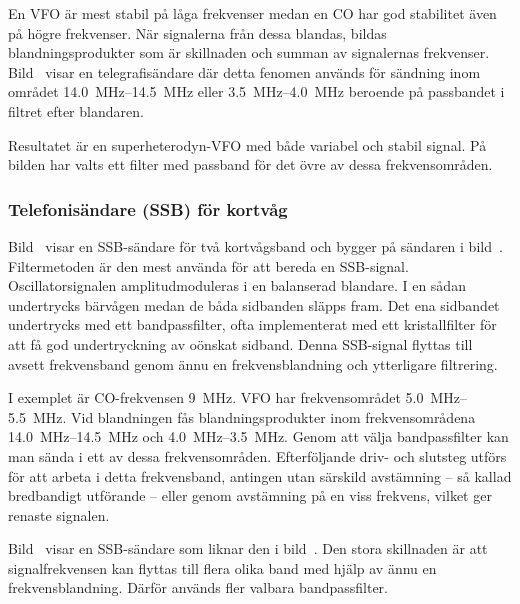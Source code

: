En VFO är mest stabil på låga frekvenser medan en CO har god
stabilitet även på högre frekvenser.
När signalerna från dessa blandas, bildas blandningsprodukter som är
skillnaden och summan av signalernas frekvenser.
Bild~ visar en telegrafisändare där detta fenomen används för
sändning inom området \SIrange{14,0}{14,5}{\mega\hertz} eller
\SIrange{3,5}{4,0}{\mega\hertz} beroende på passbandet i filtret efter
blandaren.

Resultatet är en superheterodyn-VFO med både variabel och stabil
signal.
På bilden har valts ett filter med passband för det övre av dessa
frekvensområden.

\subsubsection{Telefonisändare (SSB) för kortvåg}


Bild~ visar en SSB-sändare för två kortvågsband och
bygger på sändaren i bild~.
Filtermetoden är den mest använda för att bereda en SSB-signal.
Oscillatorsignalen amplitudmoduleras i en balanserad blandare.
I en sådan undertrycks bärvågen medan de båda sidbanden släpps fram.
Det ena sidbandet undertrycks med ett bandpassfilter, ofta implementerat med
ett kristallfilter för att få god undertryckning av oönskat sidband.
Denna SSB-signal flyttas till avsett frekvensband
genom ännu en frekvensblandning och ytterligare filtrering.

I exemplet är CO-frekvensen \qty{9}{\mega\hertz}.
VFO har frekvensområdet \SIrange{5,0}{5,5}{\mega\hertz}.
Vid blandningen fås blandningsprodukter inom frekvensområdena
\SIrange{14,0}{14,5}{\mega\hertz} och \SIrange{4,0}{3,5}{\mega\hertz}.
Genom att välja bandpassfilter kan man sända i ett av dessa frekvensområden.
Efterföljande driv- och slutsteg utförs för att arbeta i detta frekvensband,
antingen utan särskild avstämning -- så kallad bredbandigt utförande -- eller
genom avstämning på en viss frekvens, vilket ger renaste signalen.

Bild~ visar en SSB-sändare som liknar den i
bild~.
Den stora skillnaden är att signalfrekvensen kan flyttas till flera olika band
med hjälp av ännu en frekvensblandning.
Därför används fler valbara bandpassfilter.

